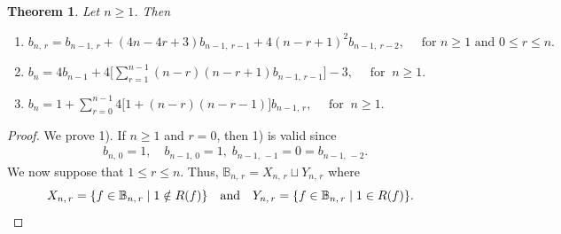 \documentclass[11pt]{article}
\newtheorem{theorem}{Theorem}[section]
\newcommand{\q}{\quad}
\newcommand{\ges}{\geqslant}
\newcommand{\les}{\leqslant}
\begin{document}
\begin{theorem} {\label{mainTheorem}}
Let $n\ge 1$. Then
\begin{enumerate}[\upshape 1)]
  \item $b_{n, \,r} = b_{n-1, \,r} + (4n-4r+3)b_{n-1, ~r-1} + 4(n-r+1)^2 b_{n-1, ~r-2},\q\mbox{ for } n\ges 1 \text{ and } 0\les r\les n.$
  \item $b_n = 4b_{n-1} + 4\big[\sum_{r=1}^{n-1} (n-r)(n-r+1)b_{n-1, \,r-1}\big]-3,\q\mbox{ for }~ n\ges 1.$
  \item $b_n=1+\sum_{r=0}^{n-1}4\big[1+(n-r)(n-r-1)\big]b_{n-1,\,r},\q\mbox{ for }~ n\ges 1.$
\end{enumerate}
\end{theorem}



\begin{proof}

We prove 1). 
%
If $n\ges 1$ and $r=0$, then 1) is valid since
\begin{align*}
&b_{n,\,0}=1,\q b_{n-1,\,0}=1, \;b_{n-1,\,-1}=0=b_{n-1,\,-2}.
\end{align*}
%
We now suppose that $1\les r\les n$. Thus, $\mathbb B_{n,\,r}= X_{n,\,r}\sqcup Y_{n,\,r}$ where 
\[
X_{n,\,r}=\{f\in \mathbb B_{n,\,r}\mid 1\notin R(f)\}\text{\quad and\quad}
Y_{n,\,r}=\{f\in \mathbb B_{n,\,r}\mid 1\in R(f)\}.
\]


\end{proof}
\end{document}
